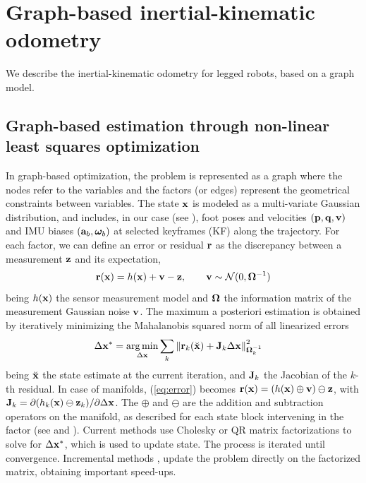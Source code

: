 
\section{Graph-based inertial-kinematic odometry}

We describe the inertial-kinematic odometry for legged robots, based on a graph model. 

\subsection{Graph-based estimation through non-linear least squares optimization}


In graph-based optimization, the problem is represented as a graph where the nodes refer to the variables and the factors (or edges) represent the geometrical constraints between variables.
%
The state ${\bf x}$ is modeled as a multi-variate Gaussian distribution, and includes, in our case (see ), foot poses and velocities $({\bf p},{\bf q},{\bf v})$ and IMU biases $({\bf a}_b,{{\bm \omega}}_b)$ at selected keyframes (KF) along the trajectory.
%
For each factor, we can define an error or residual ${\bf r}$ as the discrepancy between a measurement ${\bf z}$ and its expectation,
\begin{equation}
    {\bf r}({\bf x}) = h({\bf x}) + {\bf v} - {\bf z}, \qquad {\bf v} \sim \mathcal {\mathcal{N}} (0, {\bm \Omega}^{-1})\label{eq:error}
\end{equation}
%
being $h({\bf x})$ the sensor measurement model and ${\bm \Omega}$ the information matrix of the measurement Gaussian noise ${\bf v}$.
%
The maximum a posteriori estimation is obtained by iteratively minimizing the Mahalanobis squared norm of all linearized errors
%
\begin{align}
  \Delta {\bf x}^* &= \operatorname*{arg\,min}_{\Delta {\bf x}} \sum_k {\left\| {\bf r}_k(\breve{{\bf x}}) + {\bf J}_k \Delta {\bf x} \right\|}_{{\bm \Omega}_k^{-1}}^2 \label{eq:LeastSquares}
\end{align}
%
being $\breve{{\bf x}}$ the state estimate at the current iteration, and ${\bf J}_k$ the Jacobian of the $k$-th residual.
In case of manifolds, (\ref{eq:error}) becomes ${\bf r}({\bf x}) = (h({\bf x}) \oplus {\bf v}) \ominus {\bf z}$, with ${\bf J}_k = \partial (h_k({\bf x})\ominus{\bf z}_k)/\partial \Delta {\bf x}$. The $\oplus$ and $\ominus$ are the addition and subtraction operators on the manifold, as described for each state block intervening in the factor (see \cite{Smith_arv90} and ).
%
Current methods use Cholesky \cite{Kummerle_icra11,ila_ijrr17} or QR  \cite{Dellaert_ijrr06,Kaess_ijrr11} matrix factorizations to solve for $\Delta{\bf x}^*$, which is used to update state. 
The process is iterated until convergence.
%
Incremental methods \cite{Kaess_ijrr11,ila_ijrr17}, update the problem directly on the factorized matrix, obtaining important speed-ups.


